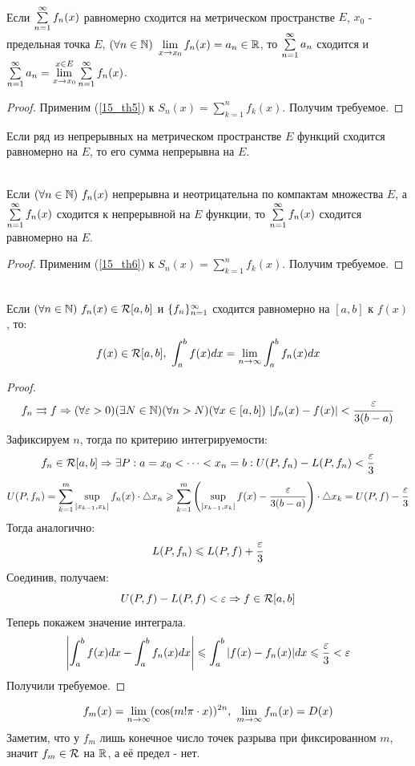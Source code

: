 \begin{theorem}\label{16_th5}\\
	Если $\ss f_n(x)$ равномерно сходится на метрическом пространстве $E$, $x_0$ - предельная точка $E$, $(\fa n\in\N)\ \lim_{x\ra x_0}f_n(x)=a_n\in\R$, то $\ss a_n$ сходится и $\ss a_n=\lim_{x\ra x_0}^{x\in E}\ss f_n(x)$.
\end{theorem}
\begin{proof}
	Применим (\ref{15_th5}) к $S_n(x)=\sum_{k=1}^nf_k(x)$. Получим требуемое.
\end{proof}
\begin{corollary}
	Если ряд из непрерывных на метрическом пространстве $E$ функций сходится равномерно на $E$, то его сумма непрерывна на $E$.
\end{corollary}
\begin{theorem}\label{16_th6}\\
	Если $(\fa n\in\N)\ f_n(x)$ непрерывна и неотрицательна по компактам множества $E$, а $\ss f_n(x)$ сходится к непрерывной на $E$ функции, то $\ss f_n(x)$ сходится равномерно на $E$.
\end{theorem}
\begin{proof}
	Применим (\ref{15_th6}) к $S_n(x)=\sum_{k=1}^nf_k(x)$. Получим требуемое.
\end{proof}
\begin{theorem}\label{16_th7}\\
	Если $(\fa n\in\N)\ f_n(x)\in\mc R[a,b]$ и $\sq[f_n]$ сходится равномерно на $[a,b]$ к $f(x)$, то:
	\[f(x)\in\mc R[a,b],\ \int_a^bf(x)dx=\lim_{n\ra\i}\int_a^bf_n(x)dx\]
\end{theorem}
\begin{proof}
	\[f_n\rra f\Ra(\fa\eps>0)(\ex N\in\N)(\fa n>N)(\fa x\in[a,b])\ |f_n(x)-f(x)|<\frac\eps{3(b-a)}\]
	Зафиксируем $n$, тогда по критерию интегрируемости:
	\[f_n\in\mc R[a,b]\Ra\ex P:a=x_0<\dots<x_n=b:U(P,f_n)-L(P,f_n)<\frac\eps3\]
	\[U(P,f_n)=\sum_{k=1}^m\sup_{[x_{k-1},x_k]}f_n(x)\cdot\tr x_n\ge\sum_{k=1}^m\l(\sup_{[x_{k-1},x_k]}f(x)-\frac{\eps}{3(b-a)}\r)\cdot\tr x_k=U(P,f)-\frac\eps3\]
	Тогда аналогично:
	\[L(P,f_n)\le L(P,f)+\frac\eps3\]
	Соединив, получаем:
	\[U(P,f)-L(P,f)<\eps\Ra f\in\mc R[a,b]\]
	Теперь покажем значение интеграла.
	\[\l|\int_a^bf(x)dx-\int_a^bf_n(x)dx\r|\le\int_a^b|f(x)-f_n(x)|dx\le\frac\eps3<\eps\]
	Получили требуемое.
\end{proof}
\begin{example}
	\[f_m(x)=\lim_{n\ra\i}(\cos(m!\pi\cdot x))^{2n},\ \lim_{m\ra\i}f_m(x)=D(x)\]
	Заметим, что у $f_m$ лишь конечное число точек разрыва при фиксированном $m$, значит $f_m\in\mc R$ на $\R$, а её предел - нет.
\end{example}
